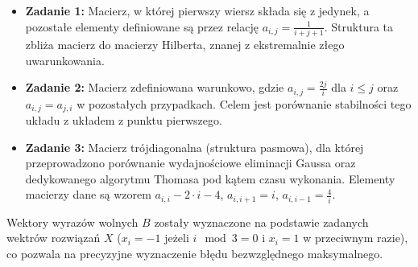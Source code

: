 \documentclass[twoside]{article}
\begin{document}
\begin{itemize}
    \item \textbf{Zadanie 1:} Macierz, w której pierwszy wiersz składa się z jedynek, a pozostałe elementy definiowane są przez relację $a_{i,j} = \frac{1}{i+j+1}$.
    Struktura ta zbliża macierz do macierzy Hilberta, znanej z ekstremalnie złego uwarunkowania.
    \item \textbf{Zadanie 2:} Macierz zdefiniowana warunkowo, gdzie $a_{i,j} = \frac{2j}{i}$ dla $i \le j$ oraz $a_{i,j} = a_{j,i}$ w pozostałych przypadkach.
    Celem jest porównanie stabilności tego układu z układem z punktu pierwszego.
    \item \textbf{Zadanie 3:} Macierz trójdiagonalna (struktura pasmowa), dla której przeprowadzono porównanie wydajnościowe eliminacji Gaussa oraz dedykowanego
    algorytmu Thomasa pod kątem czasu wykonania. Elementy macierzy dane są wzorem $a_{i,i} -2 \cdot i - 4$, $a_{i, i+1} = i$, $a_{i, i-1} = \frac{4}{i}$.
\end{itemize}

Wektory wyrazów wolnych $B$ zostały wyznaczone na podstawie zadanych wektrów rozwiązań $X$ ($x_i = -1$ jeżeli $i \mod 3 = 0$ i $x_i = 1$ w przeciwnym razie), 
co pozwala na precyzyjne wyznaczenie błędu bezwzględnego maksymalnego.
\end{document}
